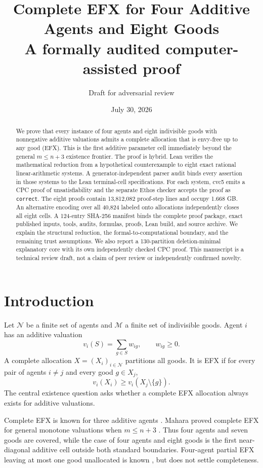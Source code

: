 \documentclass[11pt]{article}
\title{\textbf{Complete EFX for Four Additive Agents and Eight Goods}\\
\large A formally audited computer-assisted proof}
\author{Draft for adversarial review}
\date{July 30, 2026}
\theoremstyle{definition}
\newcommand{\N}{\mathcal{N}}
\newcommand{\M}{\mathcal{M}}
\begin{document}
\maketitle

\begin{abstract}
We prove that every instance of four agents and eight indivisible goods with
nonnegative additive valuations admits a complete allocation that is
envy-free up to any good (EFX). This is the first additive parameter cell
immediately beyond the general $m\le n+3$ existence frontier. The proof is
hybrid. Lean verifies the mathematical reduction from a hypothetical
counterexample to eight exact rational linear-arithmetic systems. A
generator-independent parser audit binds every assertion in those systems to
the Lean terminal-cell specifications. For each system, cvc5 emits a CPC proof
of unsatisfiability and the separate Ethos checker accepts the proof as
\texttt{correct}. The eight proofs contain 13,812,082 proof-step lines and
occupy 1.668 GB. An alternative encoding over all 40,824 labeled onto
allocations independently closes all eight cells. A 124-entry SHA-256 manifest
binds the complete proof package, exact published inputs, tools, audits,
formulas, proofs, Lean build, and source archive. We explain the structural
reduction, the formal-to-computational boundary, and the remaining trust
assumptions. We also report a 130-partition deletion-minimal explanatory core
with its own independently checked CPC proof. This manuscript is a technical
review draft, not a claim of peer review or independently confirmed novelty.
\end{abstract}

\section{Introduction}

Let $\N$ be a finite set of agents and $\M$ a finite set of indivisible
goods. Agent $i$ has an additive valuation
\[
  v_i(S)=\sum_{g\in S} w_{ig},\qquad w_{ig}\ge0.
\]
A complete allocation $X=(X_i)_{i\in\N}$ partitions all goods. It is EFX if
for every pair of agents $i\ne j$ and every good $g\in X_j$,
\[
  v_i(X_i)\ge v_i(X_j\setminus\{g\}).
\]
The central existence question asks whether a complete EFX allocation always
exists for additive valuations.

Complete EFX is known for three additive agents
\cite{CGM2024}. Mahara proved complete EFX for general monotone valuations
when $m\le n+3$ \cite{Mahara2021}. Thus four agents and seven goods are
covered, while the case of four agents and eight goods is the first
near-diagonal additive cell outside both standard boundaries. Four-agent
partial EFX leaving at most one good unallocated is known
\cite{Berger2022}, but does not settle completeness.
\end{document}
